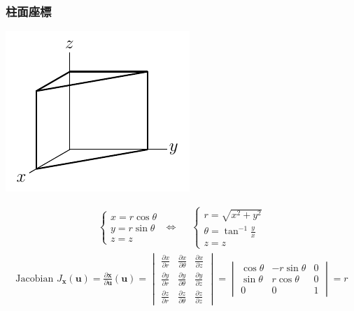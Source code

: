 \documentclass[12pt]{extarticle}
\newcommand{\ifff}{\;\Longleftrightarrow\;}
\theoremstyle{definition}
\newcommand{\vu}{\mathbf{u}}
\newcommand{\vx}{\mathbf{x}}
\begin{document}
\subsubsection*{柱面座標}
\begin{minipage}{0.25\textwidth}
  \includegraphics[scale=1,page=13]{fig/text.pdf} \\
\end{minipage}
\begin{minipage}{0.75\textwidth}
  \begin{align*}
    \begin{cases}
      x = r\cos\theta \\
      y = r\sin\theta \\
      z = z
    \end{cases} \ifff \quad
    \begin{cases}
      r = \sqrt{x^2 + y^2}\\
      \theta = \tan^{-1}\frac{y}{x} \\
      z = z 
    \end{cases}
  \end{align*}
  \begin{align*}
    \text{Jacobian } J_{\vx}(\vu) = \frac{\partial\vx}{\partial\vu}(\vu) = \begin{vmatrix}\frac{\partial x}{\partial r} & \frac{\partial x}{\partial\theta} & \frac{\partial x}{\partial z} \\ \frac{\partial y}{\partial r} & \frac{\partial y}{\partial\theta} & \frac{\partial y}{\partial z} \\ \frac{\partial z}{\partial r} & \frac{\partial z}{\partial\theta} & \frac{\partial z}{\partial z} \end{vmatrix} = \begin{vmatrix}\cos\theta & -r\sin\theta & 0 \\ \sin\theta & r\cos\theta & 0 \\ 0 & 0 & 1\end{vmatrix} = r
  \end{align*}
\end{minipage}
\end{document}
